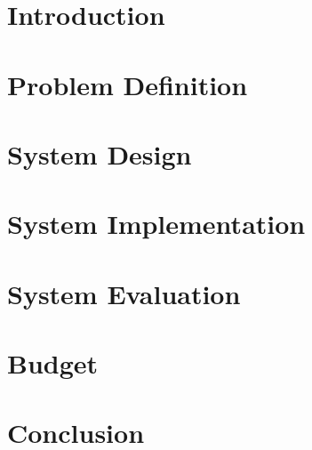 \documentclass{report}
\begin{document}
	\pagestyle{plain}
	

	

	\tableofcontents

	\listoffigures

	\listoftables

	\pagestyle{fancy}

	\chapter{Introduction}
	

	\chapter{Problem Definition}
	

	\chapter{System Design}
	

	\chapter{System Implementation}
	

	\chapter{System Evaluation}
	

	\chapter{Budget}

	\chapter{Conclusion}
	
\end{document}
